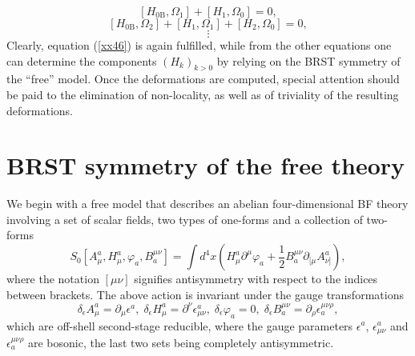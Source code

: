 \documentclass[a4paper,12pt]{article}
\begin{document}
\begin{equation}
\left[ H_{0\mathrm{B}},\Omega _{1}\right] +\left[ H_{1},\Omega _{0}\right]
=0,  \label{xx47}
\end{equation}
\begin{equation}
\left[ H_{0\mathrm{B}},\Omega _{2}\right] +\left[ H_{1},\Omega _{1}\right]
+\left[ H_{2},\Omega _{0}\right] =0,  \label{xx48}
\end{equation}
\[
\vdots 
\]
Clearly, equation (\ref{xx46}) is again fulfilled, while from the other
equations one can determine the components $\left( H_{k}\right) _{k>0}$ by
relying on the BRST symmetry of the ``free'' model. Once the deformations
are computed, special attention should be paid to the elimination of
non-locality, as well as of triviality of the resulting deformations.

\section{BRST symmetry of the free theory}

We begin with a free model that describes an abelian four-dimensional BF
theory involving a set of scalar fields, two types of one-forms and a
collection of two-forms 
\begin{equation}
S_{0}[A_{\mu }^{a},H_{\mu }^{a},\varphi _{a},B_{a}^{\mu \nu }]=\int
d^{4}x\left( H_{\mu }^{a}\partial ^{\mu }\varphi _{a}+\frac{1}{2}B_{a}^{\mu
\nu }\partial _{[\mu }A_{\nu ]}^{a}\right) ,  \label{xx1}
\end{equation}
where the notation $\left[ \mu \nu \right] $ signifies antisymmetry with
respect to the indices between brackets. The above action is invariant under
the gauge transformations 
\begin{equation}
\delta _{\epsilon }A_{\mu }^{a}=\partial _{\mu }\epsilon ^{a},\;\delta
_{\epsilon }H_{\mu }^{a}=\partial ^{\nu }\epsilon _{\mu \nu }^{a},\;\delta
_{\epsilon }\varphi _{a}=0,\;\delta _{\epsilon }B_{a}^{\mu \nu }=\partial
_{\rho }\epsilon _{a}^{\mu \nu \rho },  \label{xxgauge}
\end{equation}
which are off-shell second-stage reducible, where the gauge parameters $%
\epsilon ^{a}$, $\epsilon _{\mu \nu }^{a}$ and $\epsilon _{a}^{\mu \nu \rho
} $ are bosonic, the last two sets being completely antisymmetric.
\end{document}
